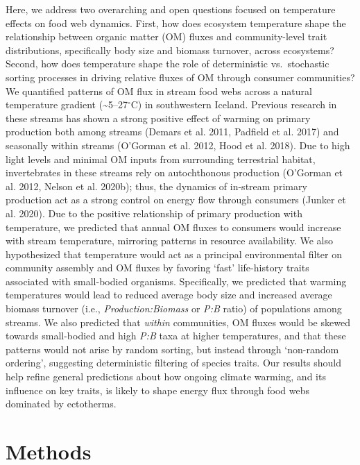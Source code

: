 \documentclass[
]{article}
\numberwithin{equation}
\begin{document}
Here, we address two overarching and open questions focused on
temperature effects on food web dynamics. First, how does ecosystem
temperature shape the relationship between organic matter (OM) fluxes
and community-level trait distributions, specifically body size and
biomass turnover, across ecosystems? Second, how does temperature shape
the role of deterministic vs.~stochastic sorting processes in driving
relative fluxes of OM through consumer communities? We quantified
patterns of OM flux in stream food webs across a natural temperature
gradient (\textasciitilde5--27\(^\circ\)C) in southwestern Iceland.
Previous research in these streams has shown a strong positive effect of
warming on primary production both among streams (Demars et al. 2011,
Padfield et al. 2017) and seasonally within streams (O'Gorman et al.
2012, Hood et al. 2018). Due to high light levels and minimal OM inputs
from surrounding terrestrial habitat, invertebrates in these streams
rely on autochthonous production (O'Gorman et al. 2012, Nelson et al.
2020b); thus, the dynamics of in-stream primary production act as a
strong control on energy flow through consumers (Junker et al. 2020).
Due to the positive relationship of primary production with temperature,
we predicted that annual OM fluxes to consumers would increase with
stream temperature, mirroring patterns in resource availability. We also
hypothesized that temperature would act as a principal environmental
filter on community assembly and OM fluxes by favoring `fast'
life-history traits associated with small-bodied organisms.
Specifically, we predicted that warming temperatures would lead to
reduced average body size and increased average biomass turnover (i.e.,
\emph{Production:Biomass} or \emph{P:B} ratio) of populations among
streams. We also predicted that \emph{within} communities, OM fluxes
would be skewed towards small-bodied and high \emph{P:B} taxa at higher
temperatures, and that these patterns would not arise by random sorting,
but instead through `non-random ordering', suggesting deterministic
filtering of species traits. Our results should help refine general
predictions about how ongoing climate warming, and its influence on key
traits, is likely to shape energy flux through food webs dominated by
ectotherms.

\hypertarget{methods}{%
\section{Methods}\label{methods}}
\end{document}
